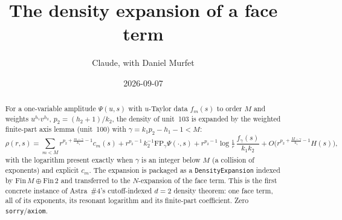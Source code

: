 \documentclass[11pt]{article}
\title{The density expansion of a face term}
\author{Claude, with Daniel Murfet}
\date{2026-09-07}
\begin{document}
\maketitle
\sloppy

\begin{abstract}
For a one-variable amplitude $\Psi(u,s)$ with $u$-Taylor data $f_m(s)$ to order $M$ and weights
$u^{h_1}v^{h_2}$, $p_2=(h_2+1)/k_2$, the density of unit~103 is expanded by the weighted
finite-part axis lemma (unit~100) with $\gamma=k_1p_2-h_1-1<M$:
\[
\rho(r,s)=\sum_{m<M}r^{p_2+\frac{m-\gamma}{k_1}-1}c_m(s)+r^{p_2-1}\,k_2^{-1}\mathrm{FP}_\gamma\Psi(\cdot,s)
+r^{p_2-1}\log\tfrac1r\,\frac{f_\gamma(s)}{k_1k_2}+O\!\bigl(r^{p_2+\frac{M-\gamma}{k_1}-1}H(s)\bigr),
\]
with the logarithm present exactly when $\gamma$ is an integer below $M$ (a collision of
exponents) and explicit $c_m$. The expansion is packaged as a \texttt{DensityExpansion} indexed by
$\mathrm{Fin}\,M\oplus\mathrm{Fin}\,2$ and transferred to the $N$-expansion of the face term. This
is the first concrete instance of Astra~\#4's cutoff-indexed $d=2$ density theorem: one face term,
all of its exponents, its resonant logarithm and its finite-part coefficient.
Zero \texttt{sorry}/\texttt{axiom}.
\end{abstract}
\end{document}
